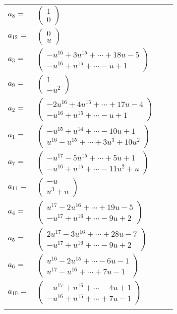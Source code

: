 \documentclass[1p]{elsarticle_modified}
\theoremstyle{definition}
\begin{document}
\begin{tabular}{m{7pt} m{180pt} m{7pt} m{180pt} }
\flushright $a_{8}=$&$\begin{pmatrix}1\\0\end{pmatrix}$ \\
\flushright $a_{12}=$&$\begin{pmatrix}0\\u\end{pmatrix}$ \\
\flushright $a_{3}=$&$\begin{pmatrix}- u^{16}+3 u^{15}+\cdots+18 u-5\\- u^{16}+u^{15}+\cdots- u+1\end{pmatrix}$ \\
\flushright $a_{9}=$&$\begin{pmatrix}1\\- u^2\end{pmatrix}$ \\
\flushright $a_{2}=$&$\begin{pmatrix}-2 u^{16}+4 u^{15}+\cdots+17 u-4\\- u^{16}+u^{15}+\cdots- u+1\end{pmatrix}$ \\
\flushright $a_{1}=$&$\begin{pmatrix}- u^{15}+u^{14}+\cdots-10 u+1\\u^{16}- u^{15}+\cdots+3 u^3+10 u^2\end{pmatrix}$ \\
\flushright $a_{7}=$&$\begin{pmatrix}- u^{17}-5 u^{15}+\cdots+5 u+1\\- u^{16}+u^{15}+\cdots-11 u^2+u\end{pmatrix}$ \\
\flushright $a_{11}=$&$\begin{pmatrix}- u\\u^3+u\end{pmatrix}$ \\
\flushright $a_{4}=$&$\begin{pmatrix}u^{17}-2 u^{16}+\cdots+19 u-5\\- u^{17}+u^{16}+\cdots-9 u+2\end{pmatrix}$ \\
\flushright $a_{5}=$&$\begin{pmatrix}2 u^{17}-3 u^{16}+\cdots+28 u-7\\- u^{17}+u^{16}+\cdots-9 u+2\end{pmatrix}$ \\
\flushright $a_{6}=$&$\begin{pmatrix}u^{16}-2 u^{15}+\cdots-6 u-1\\u^{17}- u^{16}+\cdots+7 u-1\end{pmatrix}$ \\
\flushright $a_{10}=$&$\begin{pmatrix}- u^{17}+u^{16}+\cdots-4 u+1\\- u^{16}+u^{15}+\cdots+7 u-1\end{pmatrix}$\\&\end{tabular}
\end{document}
